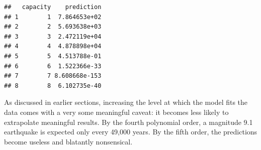 \begin{verbatim}
##   capacity    prediction
## 1        1  7.864653e+02
## 2        2  5.693638e+03
## 3        3  2.472119e+04
## 4        4  4.878898e+04
## 5        5  4.513788e-01
## 6        6  1.522366e-33
## 7        7 8.608668e-153
## 8        8  6.102735e-40
\end{verbatim}

As discussed in earlier sections, increasing the level at which the model fits the data comes with a very some meaningful caveat: it becomes less likely to extrapolate meaningful results.  By the fourth polynomial order, a magnitude 9.1 earthquake is expected only every 49,000 years.  By the fifth order, the predictions become useless and blatantly nonsensical.